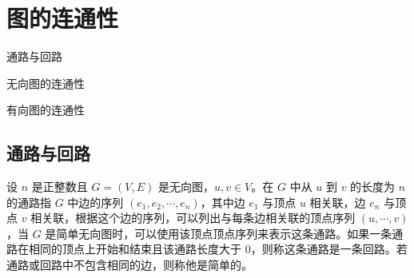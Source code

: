 \section{图的连通性}
\begin{introduction}
    \item 通路与回路
    \item 无向图的连通性
    \item 有向图的连通性
\end{introduction}

\subsection{通路与回路}

\begin{definition}[无向图的通路与回路]\label{def:无向图的通路与回路}
    设 $n$ 是正整数且 $G=(V,E)$ 是无向图，$u,v \in V$。在 $G$ 中从 $u$ 到 $v$ 的长度为 $n$ 的通路指 $G$ 中边的序列 $(e_1,e_2,\cdots,e_n)$，其中边 $e_1$ 与顶点 $u$ 相关联，边 $e_n$ 与顶点 $v$ 相关联，根据这个边的序列，可以列出与每条边相关联的顶点序列 $(u,\cdots,v)$，当 $G$ 是简单无向图时，可以使用该顶点顶点序列来表示这条通路。如果一条通路在相同的顶点上开始和结束且该通路长度大于 $0$，则称这条通路是一条回路。若通路或回路中不包含相同的边，则称他是简单的。
\end{definition}

